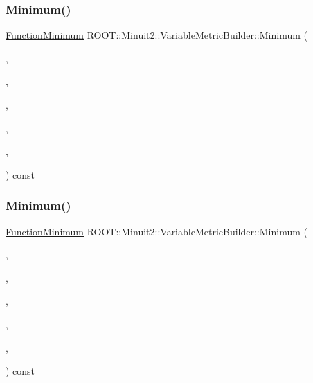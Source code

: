 \subsubsection{\texorpdfstring{Minimum()}{Minimum()}\hspace{0.1cm}{\footnotesize\ttfamily [4/6]}}
{\footnotesize\ttfamily \mbox{\hyperlink{classROOT_1_1Minuit2_1_1FunctionMinimum}{Function\+Minimum}} R\+O\+O\+T\+::\+Minuit2\+::\+Variable\+Metric\+Builder\+::\+Minimum (\begin{DoxyParamCaption}\item[{const \mbox{\hyperlink{classROOT_1_1Minuit2_1_1MnFcn}{Mn\+Fcn}} \&}]{,  }\item[{const \mbox{\hyperlink{classROOT_1_1Minuit2_1_1GradientCalculator}{Gradient\+Calculator}} \&}]{,  }\item[{const \mbox{\hyperlink{classROOT_1_1Minuit2_1_1MinimumSeed}{Minimum\+Seed}} \&}]{,  }\item[{std\+::vector$<$ \mbox{\hyperlink{classROOT_1_1Minuit2_1_1MinimumState}{Minimum\+State}} $>$ \&}]{,  }\item[{unsigned int}]{,  }\item[{double}]{ }\end{DoxyParamCaption}) const}

\mbox{\label{classROOT_1_1Minuit2_1_1VariableMetricBuilder_a6214271e1802f110e94725295f3900fc}} 
\subsubsection{\texorpdfstring{Minimum()}{Minimum()}\hspace{0.1cm}{\footnotesize\ttfamily [5/6]}}
{\footnotesize\ttfamily \mbox{\hyperlink{classROOT_1_1Minuit2_1_1FunctionMinimum}{Function\+Minimum}} R\+O\+O\+T\+::\+Minuit2\+::\+Variable\+Metric\+Builder\+::\+Minimum (\begin{DoxyParamCaption}\item[{const \mbox{\hyperlink{classROOT_1_1Minuit2_1_1MnFcn}{Mn\+Fcn}} \&}]{,  }\item[{const \mbox{\hyperlink{classROOT_1_1Minuit2_1_1GradientCalculator}{Gradient\+Calculator}} \&}]{,  }\item[{const \mbox{\hyperlink{classROOT_1_1Minuit2_1_1MinimumSeed}{Minimum\+Seed}} \&}]{,  }\item[{std\+::vector$<$ \mbox{\hyperlink{classROOT_1_1Minuit2_1_1MinimumState}{Minimum\+State}} $>$ \&}]{,  }\item[{unsigned int}]{,  }\item[{double}]{ }\end{DoxyParamCaption}) const}

